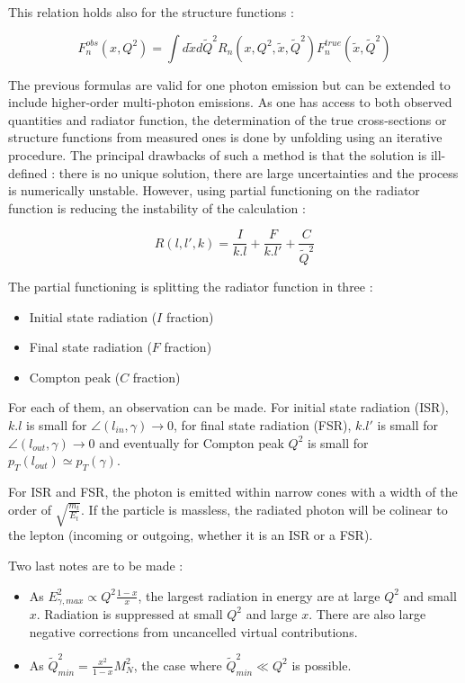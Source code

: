 This relation holds also for the structure functions :

\[F_{n}^{obs}(x,Q^{2}) = \int d\tilde{x}d\tilde{Q}^{2}R_{n}(x,Q^{2},\tilde{x},\tilde{Q}^{2})F_{n}^{true}(\tilde{x},\tilde{Q}^{2})\]

The previous formulas are valid for one photon emission but can be extended to include higher-order multi-photon emissions. As one has access to both observed quantities and radiator function, the determination of the true cross-sections or structure functions from measured ones is done by unfolding using an iterative procedure. The principal drawbacks of such a method is that the solution is ill-defined : there is no unique solution, there are large uncertainties and the process is numerically unstable. However, using partial functioning on the radiator function is reducing the instability of the calculation :

\[R(l,l',k) = \frac{I}{k.l}+\frac{F}{k.l'}+\frac{C}{\tilde{Q}^{2}}\]

The partial functioning is splitting the radiator function in three :
\begin{itemize}
\item Initial state radiation ($I$ fraction)
\item Final state radiation ($F$ fraction)
\item Compton peak ($C$ fraction)
\end{itemize}

For each of them, an observation can be made. For initial state radiation (ISR), $k.l$ is small for
$\angle (l_{in},\gamma) \rightarrow 0$, for final state radiation (FSR), $k.l'$ is small for
$\angle (l_{out},\gamma) \rightarrow 0$ and eventually for Compton peak $Q^{2}$ is small for
$p_{T}(l_{out}) \simeq p_{T}(\gamma)$.

For ISR and FSR, the photon is emitted within narrow cones with a width of the order of $\sqrt{\frac{m_{t}}{E_{t}}}$. If the particle is massless, the radiated photon will be colinear to the lepton (incoming or outgoing, whether it is an ISR or a FSR).

Two last notes are to be made :
\begin{itemize}
\item As $E^{2}_{\gamma,max} \propto Q^{2}\frac{1-x}{x}$, the largest radiation in energy are at large $Q^{2}$ and small $x$. Radiation is suppressed at small $Q^{2}$ and large $x$. There are also large negative corrections from uncancelled virtual contributions.
\item As $\tilde{Q}^{2}_{min} = \frac{x^{2}}{1-x}M^{2}_{N}$, the case where $\tilde{Q}^{2}_{min} \ll Q^{2}$ is possible.
\end{itemize}

